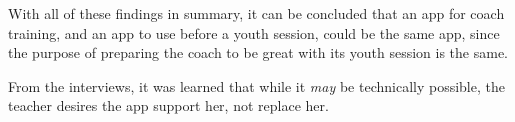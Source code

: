 With all of these findings in summary, it can be concluded that an app for coach training, and an app to use before a youth session, could be the same app, since the purpose of preparing the coach to be great with its youth session is the same.

From the interviews, it was learned that while it \textit{may} be technically possible, the teacher desires the app support her, not replace her.
